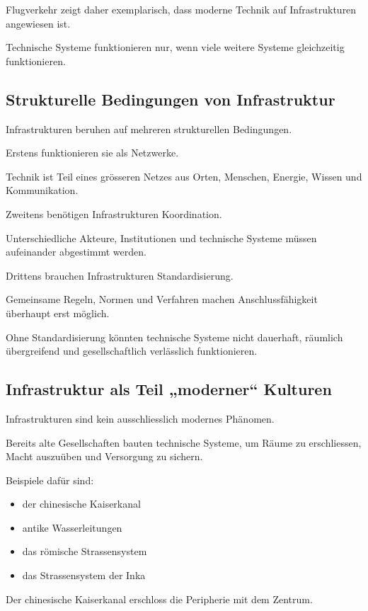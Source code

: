 Flugverkehr zeigt daher exemplarisch,
dass moderne Technik
auf Infrastrukturen angewiesen ist.

Technische Systeme funktionieren nur,
wenn viele weitere Systeme
gleichzeitig funktionieren.

\subsection{Strukturelle Bedingungen von Infrastruktur}

Infrastrukturen beruhen auf mehreren
strukturellen Bedingungen.

Erstens funktionieren sie als Netzwerke.

Technik ist Teil eines grösseren Netzes
aus Orten,
Menschen,
Energie,
Wissen
und Kommunikation.

Zweitens benötigen Infrastrukturen Koordination.

Unterschiedliche Akteure,
Institutionen
und technische Systeme
müssen aufeinander abgestimmt werden.

Drittens brauchen Infrastrukturen Standardisierung.

Gemeinsame Regeln,
Normen
und Verfahren
machen Anschlussfähigkeit
überhaupt erst möglich.

Ohne Standardisierung
könnten technische Systeme
nicht dauerhaft,
räumlich übergreifend
und gesellschaftlich verlässlich funktionieren.

\subsection{Infrastruktur als Teil „moderner“ Kulturen}

Infrastrukturen sind kein ausschliesslich modernes Phänomen.

Bereits alte Gesellschaften
bauten technische Systeme,
um Räume zu erschliessen,
Macht auszuüben
und Versorgung zu sichern.

Beispiele dafür sind:

\begin{itemize}
\item der chinesische Kaiserkanal
\item antike Wasserleitungen
\item das römische Strassensystem
\item das Strassensystem der Inka
\end{itemize}

Der chinesische Kaiserkanal
erschloss die Peripherie
mit dem Zentrum.

